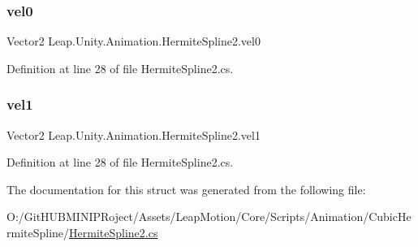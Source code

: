 \subsubsection{\texorpdfstring{vel0}{vel0}}
{\footnotesize\ttfamily Vector2 Leap.\+Unity.\+Animation.\+Hermite\+Spline2.\+vel0}



Definition at line 28 of file Hermite\+Spline2.\+cs.

\mbox{\label{struct_leap_1_1_unity_1_1_animation_1_1_hermite_spline2_a430d3b4dfb7c08fbaff770671eb42eb4}} 
\subsubsection{\texorpdfstring{vel1}{vel1}}
{\footnotesize\ttfamily Vector2 Leap.\+Unity.\+Animation.\+Hermite\+Spline2.\+vel1}



Definition at line 28 of file Hermite\+Spline2.\+cs.



The documentation for this struct was generated from the following file\+:\begin{DoxyCompactItemize}
\item 
O\+:/\+Git\+H\+U\+B\+M\+I\+N\+I\+P\+Roject/\+Assets/\+Leap\+Motion/\+Core/\+Scripts/\+Animation/\+Cubic\+Hermite\+Spline/\mbox{\hyperlink{_hermite_spline2_8cs}{Hermite\+Spline2.\+cs}}\end{DoxyCompactItemize}
